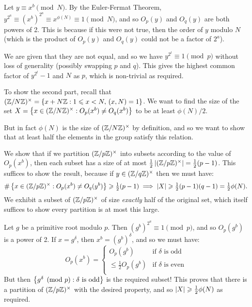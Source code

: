 \documentclass{article}
\begin{document}
\begin{prf}
    Let $y \equiv x^b \pmod N$. By the Euler-Fermat Theorem, $y^{2^a} \equiv (x^b)^{2^a} \equiv x^{\phi(N)} \equiv 1 \pmod N$, and so $O_p(y)$ and $O_q(y)$ are both powers of 2. This is because if this were not true, then the order of $y$ modulo $N$ (which is the product of $O_p(y)$ and $O_q(y)$ could not be a factor of $2^a$).
    
    We are given that they are not equal, and so we have $y^{2^t} \equiv 1 \pmod p$ without loss of generality (possibly swapping $p$ and $q$). This gives the highest common factor of $y^{2^t}-1$ and $N$ as $p$, which is non-trivial as required.
    
    To show the second part, recall that $(\mathbb{Z}/N\mathbb{Z})^\times = \left\lbrace x + N\mathbb{Z} : 1 \leqslant x < N, \, (x, N) = 1 \right\rbrace$. We want to find the size of the set $X = \left\lbrace x \in (\mathbb{Z}/N\mathbb{Z})^\times : O_p(x^b) \neq O_q(x^b) \right\rbrace$ to be at least $\phi(N)/2$.
    
    But in fact $\phi(N)$ is the size of $(\mathbb{Z}/N\mathbb{Z})^\times$ by definition, and so we want to show that at least half the elements in the group satisfy this relation.
    
    We show that if we partition $(\mathbb{Z}/p\mathbb{Z})^\times$ into subsets according to the value of $O_p(x^b)$, then each subset has a size of at most $\tfrac{1}{2} \left\lvert (\mathbb{Z}/p\mathbb{Z})^\times \right\rvert = \tfrac{1}{2}(p-1)$. This suffices to show the result, because if $y \in (\mathbb{Z}/q\mathbb{Z})^\times$ then we must have:
    \[
	\# \left\lbrace x \in (\mathbb{Z}/p\mathbb{Z})^\times : O_p(x^b) \neq O_q(y^b) \right\rbrace \geqslant \tfrac{1}{2} (p-1)
	\implies \left\lvert X \right\rvert \geqslant \tfrac{1}{2}(p-1)(q-1) = \tfrac{1}{2}\phi(N).
	\]
	We exhibit a subset of $(\mathbb{Z}/p\mathbb{Z})^\times$ of size \textit{exactly} half of the original set, which itself suffices to show every partition is at most this large.
	
	Let $g$ be a primitive root modulo $p$. Then $(g^b)^{2^a} \equiv 1 \pmod p$, and so $O_p(g^b)$ is a power of 2. If $x = g^\delta$, then $x^b = (g^b)^\delta$, and so we must have:
	\[
	O_p(x^b) = \begin{cases}
		O_p(g^b) & \text{if $\delta$ is odd} \\
		\leq \tfrac{1}{2} O_p(g^b) & \text{if $\delta$ is even} \\
	\end{cases}
	\]
	But then $\left\lbrace g^\delta \pmod p : \delta \text{ is odd} \right\rbrace$ is the required subset! This proves that there is a partition of $(\mathbb{Z}/p\mathbb{Z})^\times$ with the desired property, and so $\left\lvert X \right\rvert \geqslant \tfrac{1}{2} \phi(N)$ as required.
\end{prf}
\end{document}
